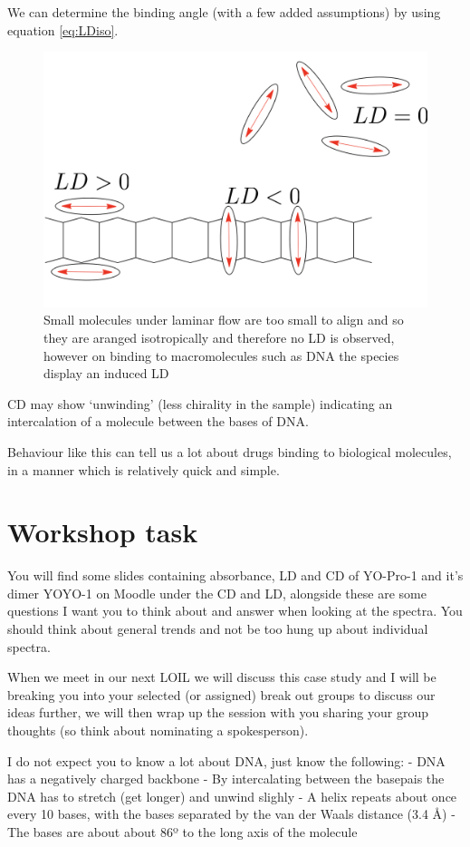 \documentclass[
]{book}
\begin{document}
We can determine the binding angle (with a few added assumptions) by using equation \eqref{eq:LDiso}.

\begin{figure}

{\centering \includegraphics[width=0.6\linewidth]{images/inducedLD} 

}

\caption{Small molecules under laminar flow are too small to align and so they are aranged isotropically and therefore no LD is observed, however on binding to macromolecules such as DNA the species display an induced LD}\label{fig:inducedLD}
\end{figure}

CD may show `unwinding' (less chirality in the sample) indicating an intercalation of a molecule between the bases of DNA.

Behaviour like this can tell us a lot about drugs binding to biological molecules, in a manner which is relatively quick and simple.

\hypertarget{workshop-task}{%
\section{Workshop task}\label{workshop-task}}

You will find some slides containing absorbance, LD and CD of YO-Pro-1 and it's dimer YOYO-1 on Moodle under the CD and LD, alongside these are some questions I want you to think about and answer when looking at the spectra. You should think about general trends and not be too hung up about individual spectra.

When we meet in our next LOIL we will discuss this case study and I will be breaking you into your selected (or assigned) break out groups to discuss our ideas further, we will then wrap up the session with you sharing your group thoughts (so think about nominating a spokesperson).

I do not expect you to know a lot about DNA, just know the following:
- DNA has a negatively charged backbone
- By intercalating between the basepais the DNA has to stretch (get longer) and unwind slighly
- A helix repeats about once every 10 bases, with the bases separated by the van der Waals distance (3.4 Å)
- The bases are about about 86º to the long axis of the molecule
\end{document}
